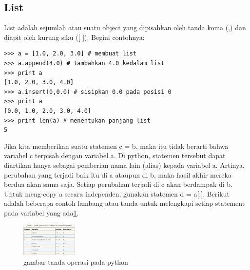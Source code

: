\subsection{List}
List adalah sejumlah atau suatu object yang dipisahkan oleh tanda koma (,) dan diapit oleh kurung siku
([ ]). Begini contohnya:
\begin{verbatim}
>>> a = [1.0, 2.0, 3.0] # membuat list
>>> a.append(4.0) # tambahkan 4.0 kedalam list
>>> print a
[1.0, 2.0, 3.0, 4.0]
>>> a.insert(0,0.0) # sisipkan 0.0 pada posisi 0
>>> print a
[0.0, 1.0, 2.0, 3.0, 4.0]
>>> print len(a) # menentukan panjang list
5
\end{verbatim}
Jika kita memberikan suatu statemen c = b, maka itu tidak berarti bahwa variabel c terpisah dengan
variabel a. Di python, statemen tersebut dapat diartikan hanya sebagai pemberian nama lain
(alias) kepada variabel a. Artinya, perubahan yang terjadi baik itu di a ataupun di b, maka hasil
akhir mereka berdua akan sama saja. Setiap perubahan terjadi di c akan berdampak di b.
Untuk meng-copy a secara independen, gunakan statemen d = a[:]. 
Berikut adalah beberapa contoh lambang atau tanda untuk melengkapi setiap statement pada
variabel yang ada\ref{operate}.
\begin{figure}[ht]
    \centerline{\includegraphics[width=0.25\textwidth]{figures/operate.png}}
    \caption{gambar tanda operasi pada python}
    \label{operate}
    \end{figure}
